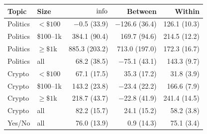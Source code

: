 \begin{tabular}{llrrr}
\toprule
Topic & Size & $\mathrm{info}$ & Between & Within \\
\midrule
Politics & $<\$100$ & \ensuremath{-}0.5 (33.9) & \ensuremath{-}126.6 (36.4) & 126.1 (10.3) \\
Politics & \$100--1k & 384.1 (90.4) & 169.7 (94.6) & 214.5 (12.2) \\
Politics & $\ge\$1$k & 885.3 (203.2) & 713.0 (197.0) & 172.3 (16.7) \\
Politics & all & 68.2 (38.5) & \ensuremath{-}75.1 (43.1) & 143.3 (9.7) \\
\addlinespace
Crypto & $<\$100$ & 67.1 (17.5) & 35.3 (17.2) & 31.8 (3.9) \\
Crypto & \$100--1k & 143.2 (23.8) & \ensuremath{-}23.4 (22.2) & 166.6 (7.9) \\
Crypto & $\ge\$1$k & 218.7 (43.7) & \ensuremath{-}22.8 (41.9) & 241.4 (14.5) \\
Crypto & all & 82.2 (15.7) & 24.1 (15.2) & 58.2 (3.8) \\
\addlinespace
Yes/No & all & 76.0 (13.9) & 0.9 (14.3) & 75.1 (3.4) \\
\bottomrule
\end{tabular}
